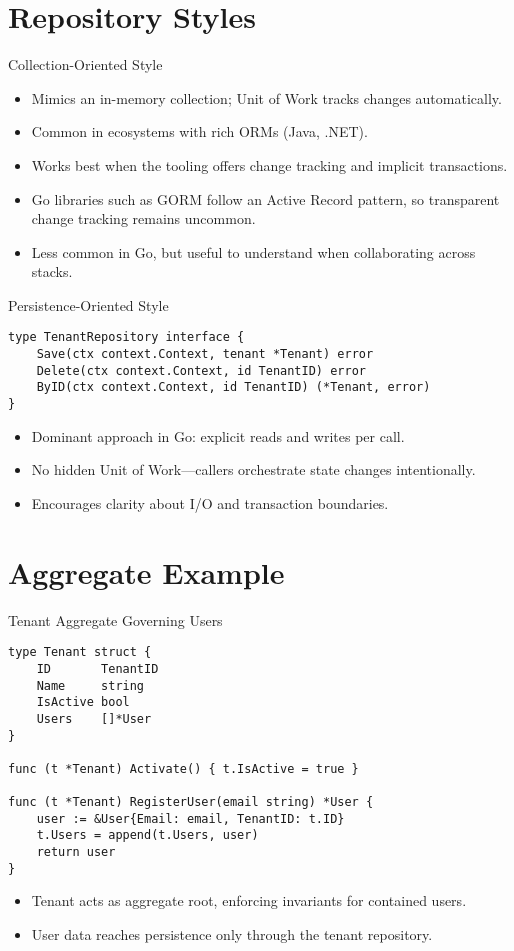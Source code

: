 \documentclass{beamer}
\begin{document}
\section{Repository Styles}

\begin{frame}{Collection-Oriented Style}
  \begin{itemize}
    \item Mimics an in-memory collection; Unit of Work tracks changes automatically.
    \item Common in ecosystems with rich ORMs (Java, .NET).
    \item Works best when the tooling offers change tracking and implicit transactions.
    \item Go libraries such as GORM follow an Active Record pattern, so transparent change tracking remains uncommon.
    \item Less common in Go, but useful to understand when collaborating across stacks.
  \end{itemize}
\end{frame}

\begin{frame}[fragile]{Persistence-Oriented Style}
  \begin{lstlisting}
type TenantRepository interface {
    Save(ctx context.Context, tenant *Tenant) error
    Delete(ctx context.Context, id TenantID) error
    ByID(ctx context.Context, id TenantID) (*Tenant, error)
}
  \end{lstlisting}
  \begin{itemize}
    \item Dominant approach in Go: explicit reads and writes per call.
    \item No hidden Unit of Work—callers orchestrate state changes intentionally.
    \item Encourages clarity about I/O and transaction boundaries.
  \end{itemize}
\end{frame}

\section{Aggregate Example}

\begin{frame}[fragile]{Tenant Aggregate Governing Users}
  \begin{lstlisting}
type Tenant struct {
    ID       TenantID
    Name     string
    IsActive bool
    Users    []*User
}

func (t *Tenant) Activate() { t.IsActive = true }

func (t *Tenant) RegisterUser(email string) *User {
    user := &User{Email: email, TenantID: t.ID}
    t.Users = append(t.Users, user)
    return user
}
  \end{lstlisting}
  \begin{itemize}
    \item Tenant acts as aggregate root, enforcing invariants for contained users.
    \item User data reaches persistence only through the tenant repository.
  \end{itemize}
\end{frame}
\end{document}
